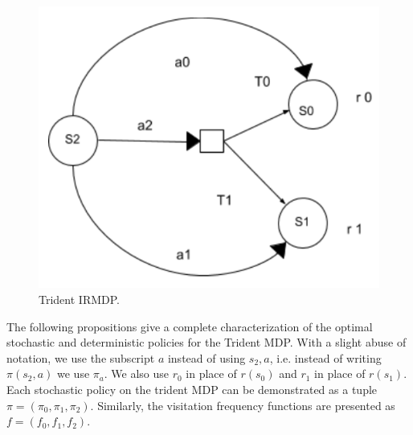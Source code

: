 \begin{figure}
	\begin{center}
    \includegraphics[scale=0.4]{images/Trident_MDP.pdf}
	\end{center}
	\caption{Trident IRMDP.}
	\label{fig:trident} 
\end{figure}



The following propositions give a complete characterization of the optimal stochastic and deterministic policies for the Trident MDP. With a slight abuse of notation, we use the subscript $a$ instead of using $s_2,a$, i.e. instead of writing $\pi(s_2, a)$ we use $\pi_a$. 
We also use $r_{0}$ in place of $r(s_0)$ and $r_{1}$ in place of $r(s_1)$. Each stochastic policy on the trident MDP can be demonstrated as a tuple $\pi = (\pi_0, \pi_1, \pi_2)$. %
Similarly, the visitation frequency functions are presented as $f = (f_0, f_1, f_2)$.

